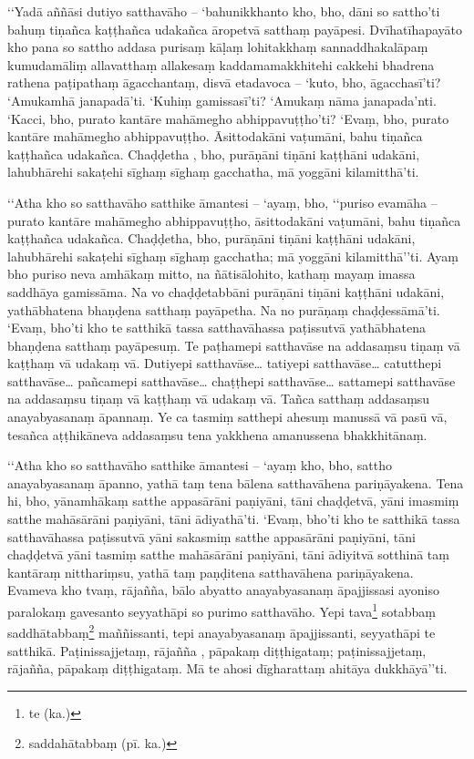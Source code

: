 ‘‘Yadā aññāsi dutiyo satthavāho – ‘bahunikkhanto kho, bho, dāni so sattho’ti bahuṃ tiṇañca kaṭṭhañca udakañca āropetvā satthaṃ payāpesi. Dvīhatīhapayāto kho pana so sattho addasa purisaṃ kāḷaṃ lohitakkhaṃ sannaddhakalāpaṃ kumudamāliṃ allavatthaṃ allakesaṃ kaddamamakkhitehi cakkehi bhadrena rathena paṭipathaṃ āgacchantaṃ, disvā etadavoca – ‘kuto, bho, āgacchasī’ti? ‘Amukamhā janapadā’ti. ‘Kuhiṃ gamissasī’ti? ‘Amukaṃ nāma janapada’nti. ‘Kacci, bho, purato kantāre mahāmegho abhippavuṭṭho’ti? ‘Evaṃ, bho, purato kantāre mahāmegho abhippavuṭṭho. Āsittodakāni vaṭumāni, bahu tiṇañca kaṭṭhañca udakañca. Chaḍḍetha , bho, purāṇāni tiṇāni kaṭṭhāni udakāni, lahubhārehi sakaṭehi sīghaṃ sīghaṃ gacchatha, mā yoggāni kilamitthā’ti.

‘‘Atha kho so satthavāho satthike āmantesi – ‘ayaṃ, bho, ‘‘puriso evamāha – purato kantāre mahāmegho abhippavuṭṭho, āsittodakāni vaṭumāni, bahu tiṇañca kaṭṭhañca udakañca. Chaḍḍetha, bho, purāṇāni tiṇāni kaṭṭhāni udakāni, lahubhārehi sakaṭehi sīghaṃ sīghaṃ gacchatha; mā yoggāni kilamitthā’’ti. Ayaṃ bho puriso neva amhākaṃ mitto, na ñātisālohito, kathaṃ mayaṃ imassa saddhāya gamissāma. Na vo chaḍḍetabbāni purāṇāni tiṇāni kaṭṭhāni udakāni, yathābhatena bhaṇḍena satthaṃ payāpetha. Na no purāṇaṃ chaḍḍessāmā’ti. ‘Evaṃ, bho’ti kho te satthikā tassa satthavāhassa paṭissutvā yathābhatena bhaṇḍena satthaṃ payāpesuṃ. Te paṭhamepi satthavāse na addasaṃsu tiṇaṃ vā kaṭṭhaṃ vā udakaṃ vā. Dutiyepi satthavāse… tatiyepi satthavāse… catutthepi satthavāse… pañcamepi satthavāse… chaṭṭhepi satthavāse… sattamepi satthavāse na addasaṃsu tiṇaṃ vā kaṭṭhaṃ vā udakaṃ vā. Tañca satthaṃ addasaṃsu anayabyasanaṃ āpannaṃ. Ye ca tasmiṃ satthepi ahesuṃ manussā vā pasū vā, tesañca aṭṭhikāneva addasaṃsu tena yakkhena amanussena bhakkhitānaṃ.

‘‘Atha kho so satthavāho satthike āmantesi – ‘ayaṃ kho, bho, sattho anayabyasanaṃ āpanno, yathā taṃ tena bālena satthavāhena pariṇāyakena. Tena hi, bho, yānamhākaṃ satthe appasārāni paṇiyāni, tāni chaḍḍetvā, yāni imasmiṃ satthe mahāsārāni paṇiyāni, tāni ādiyathā’ti. ‘Evaṃ, bho’ti kho te satthikā tassa satthavāhassa paṭissutvā yāni sakasmiṃ satthe appasārāni paṇiyāni, tāni chaḍḍetvā yāni tasmiṃ satthe mahāsārāni paṇiyāni, tāni ādiyitvā sotthinā taṃ kantāraṃ nitthariṃsu, yathā taṃ paṇḍitena satthavāhena pariṇāyakena. Evameva kho tvaṃ, rājañña, bālo abyatto anayabyasanaṃ āpajjissasi ayoniso paralokaṃ gavesanto seyyathāpi so purimo satthavāho. Yepi tava\footnote{te (ka.)} sotabbaṃ saddhātabbaṃ\footnote{saddahātabbaṃ (pī. ka.)} maññissanti, tepi anayabyasanaṃ āpajjissanti, seyyathāpi te satthikā. Paṭinissajjetaṃ, rājañña , pāpakaṃ diṭṭhigataṃ; paṭinissajjetaṃ, rājañña, pāpakaṃ diṭṭhigataṃ. Mā te ahosi dīgharattaṃ ahitāya dukkhāyā’’ti.

